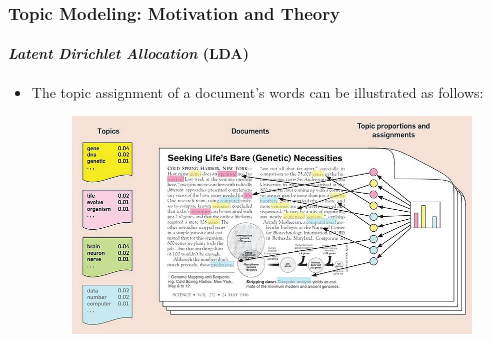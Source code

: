 \documentclass[xcolor=dvipsnames]{beamer}
\begin{document}
\begin{frame}
\frametitle{Topic Modeling: Motivation and Theory}
\framesubtitle{\textit{Latent Dirichlet Allocation} (LDA)}
\begin{itemize}
\vspace{-0.5cm}
\item The topic assignment of a document's words can be illustrated as follows:
	\vspace{-0.5cm}
	\begin{figure}[h!]
  	\centering
  	\includegraphics[scale = 0.4]{../plots/presentation/lda_topic_assignment.jpeg}
	\end{figure}

\end{itemize}
\end{frame}
\end{document}
